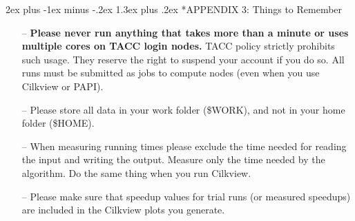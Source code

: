 \documentclass[11pt]{article}
\makeatletter
\renewcommand{\section}{\@startsection{section}{1}{0mm}%
                                   {2ex plus -1ex minus -.2ex}%
                                   {1.3ex plus .2ex}%
                                   {\normalfont\Large\bfseries}}%
\makeatother
\begin{document}
\section*{APPENDIX 3: Things to Remember}
%
 \begin{itemize}
%
\vspace{-0.1cm}
 \item[--] {\bf Please never run anything that takes more than a minute or uses multiple cores on TACC login nodes.}
          TACC policy strictly prohibits such usage. They reserve the right to suspend your account if you
          do so. All runs must be submitted as jobs to compute nodes (even when you use Cilkview or PAPI).
%
\vspace{-0.1cm}
 \item[--] Please store all data in your work folder (\$WORK), and not in your home folder (\$HOME).
%
\vspace{-0.1cm}
 \item[--] When measuring running times please exclude the time needed for reading the input and writing
          the output. Measure only the time needed by the algorithm. Do the same thing when you
          run Cilkview.
%
\vspace{-0.1cm}
 \item[--] Please make sure that speedup values for trial runs (or measured speedups) are
           included in the Cilkview plots you generate.
%
 \end{itemize}
\end{document}
